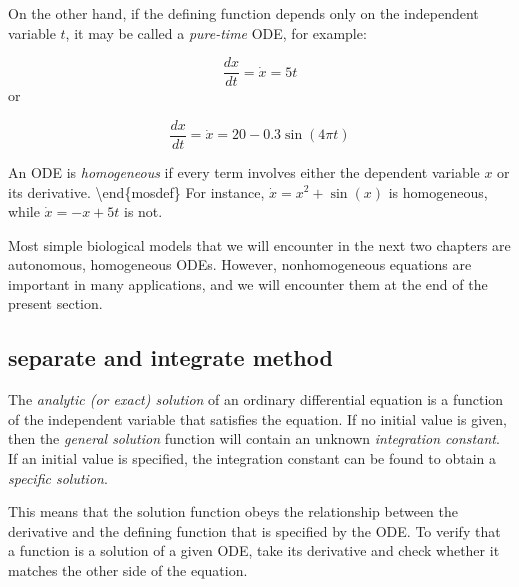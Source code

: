 \documentclass[
  letterpaper,
  DIV=11,
  numbers=noendperiod]{scrreprt}
\begin{document}
On the other hand, if the defining function depends only on the
independent variable \(t\), it may be called a \emph{pure-time} ODE, for
example:

\[ 
\frac{dx}{dt} = \dot x = 5t
\] or

\[
\frac{dx}{dt} = \dot x = 20 - 0.3 \sin(4 \pi t)
\]

An ODE is \emph{homogeneous} if
every term involves either the dependent variable \(x\) or its
derivative. \textbackslash end\{mosdef\} For instance,
\(\dot x = x^2 + \sin(x)\) is homogeneous, while \(\dot x = -x + 5t\) is
not.

Most simple biological models that we will encounter in the next two
chapters are autonomous, homogeneous ODEs. However, nonhomogeneous
equations are important in many applications, and we will encounter them
at the end of the present section.

\hypertarget{separate-and-integrate-method}{%
\subsection{separate and integrate
method}\label{separate-and-integrate-method}}

\begin{tcolorbox}[enhanced jigsaw, coltitle=black, arc=.35mm, opacitybacktitle=0.6, breakable, bottomtitle=1mm, toptitle=1mm, titlerule=0mm, colback=white, leftrule=.75mm, rightrule=.15mm, colframe=quarto-callout-note-color-frame, colbacktitle=quarto-callout-note-color!10!white, opacityback=0, title=\textcolor{quarto-callout-note-color}{\faInfo}\hspace{0.5em}{Definition}, left=2mm, toprule=.15mm, bottomrule=.15mm]

The \emph{analytic (or exact) solution} of an ordinary differential
equation is a function of the independent variable that satisfies the
equation. If no initial value is given, then the \emph{general solution}
function will contain an unknown \emph{integration constant}. If an
initial value is specified, the integration constant can be found to
obtain a \emph{specific solution}.

\end{tcolorbox}

This means that the solution function obeys the relationship between the
derivative and the defining function that is specified by the ODE. To
verify that a function is a solution of a given ODE, take its derivative
and check whether it matches the other side of the equation.
\end{document}
